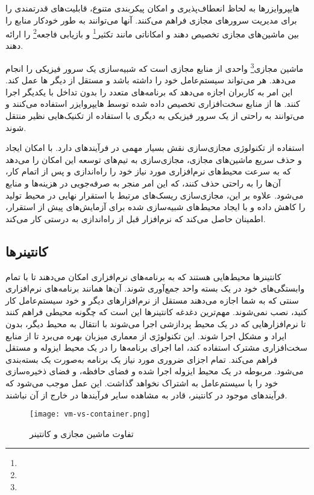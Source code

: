 هایپروایزرها به لحاظ انعطاف‌پذیری و امکان پیکربندی متنوع، قابلیت‌های قدرتمندی را برای مدیریت سرورهای مجازی فراهم می‌کنند. آنها می‌توانند به طور خودکار منابع را بین ماشین‌های مجازی تخصیص دهند و امکاناتی مانند تکثیر\footnote{} و بازیابی فاجعه\footnote{} را ارائه دهند.

ماشین مجازی\footnote{} واحدی از منابع مجازی است که شبیه‌سازی یک سرور فیزیکی را انجام می‌دهد. هر  می‌تواند سیستم‌عامل خود را داشته باشد و مستقل از دیگر ‌ها عمل کند. این امر به کاربران اجازه می‌دهد که برنامه‌های متعدد را بدون تداخل با یکدیگر اجرا کنند. ‌ها از منابع سخت‌افزاری تخصیص داده شده توسط هایپروایزر استفاده می‌کنند و می‌توانند به راحتی از یک سرور فیزیکی به دیگری با استفاده از تکنیک‌هایی نظیر  منتقل شوند. 

استفاده از تکنولوژی مجازی‌سازی نقش بسیار مهمی در فرآیندهای  دارد. با امکان ایجاد و حذف سریع ماشین‌های مجازی، مجازی‌سازی به تیم‌های توسعه این امکان را می‌دهد که به سرعت محیط‌های نرم‌افزاری مورد نیاز خود را راه‌اندازی و پس از اتمام کار، آن‌ها را به راحتی حذف کنند، که این امر منجر به صرفه‌جویی در هزینه‌ها و منابع می‌شود. علاوه بر این، مجازی‌سازی ریسک‌های مرتبط با استقرار نهایی در محیط تولید را کاهش داده و با ایجاد محیط‌های شبیه‌سازی شده برای آزمایش‌های پیش از استقرار، اطمینان حاصل می‌کند که نرم‌افزار قبل از راه‌اندازی به درستی کار می‌کند.

\subsection{کانتینرها}

کانتینرها محیط‌هایی هستند که به برنامه‌های نرم‌افزاری امکان می‌دهند تا با تمام وابستگی‌های خود در یک بسته واحد جمع‌آوری شوند. آن‌ها همانند برنامه‌های نرم‌افزاری سنتی که به شما اجازه می‌دهند مستقل از نرم‌افزارهای دیگر و خود سیستم‌عامل کار کنید، نصب نمی‌شوند. مهم‌ترین دغدغه کانتینرها این است که چگونه محیطی فراهم کنند تا نرم‌افزارهایی که در یک محیط پردازشی اجرا می‌شوند با انتقال به محیط دیگر، بدون ایراد و مشکل اجرا شوند. این تکنولوژی از معماری میزبان بهره می‌برد تا از منابع سخت‌افزاری مشترک استفاده کند، اما اجرای برنامه‌ها را در یک محیط ایزوله و مستقل فراهم می‌کند. تمام اجزای ضروری مورد نیاز یک برنامه به‌صورت یک  بسته‌بندی می‌شود.  مربوطه در یک محیط ایزوله اجرا شده و فضای حافظه،  و فضای ذخیره‌سازی خود را با سیستم‌عامل به اشتراک نخواهد گذاشت. این عمل موجب می‌شود که فرآیندهای موجود در کانتینر، قادر به مشاهده سایر فرآیندها در خارج از آن نباشند.
\begin{figure}[t]
	\centering
	\texttt{[image: vm-vs-container.png]}
	\caption{تفاوت ماشین مجازی و کانتینر}
	\label{fig: vm vs container}
\end{figure}

